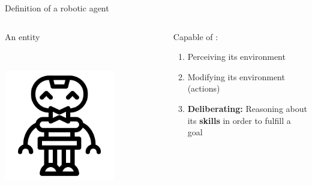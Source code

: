 \begin{frame}{Definition of a robotic agent}

    \begin{columns}[T]
        \begin{column}{0.3\textwidth}
            An entity

            ~

            \includegraphics[width = 0.7\textwidth]{images/icons8-robot-gustav-500.png}
        \end{column}
        \begin{column}{0.7\textwidth}
            \center Capable of :
            \pause
            \begin{enumerate}
                \item Perceiving its environment
                \pause
                \item Modifying its environment (actions)
                \pause
                \item \textbf{Deliberating:} Reasoning about its \textbf{skills} in order to fulfill a goal
            \end{enumerate}
        \end{column}
    \end{columns}

 
\end{frame}

